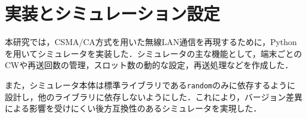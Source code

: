 \documentclass[a4paper, 10pt]{ltjsarticle}
\begin{document}





\section{実装とシミュレーション設定}

本研究では，CSMA/CA方式を用いた無線LAN通信を再現するために，Pythonを用いてシミュレータを実装した．シミュレータの主な機能として，端末ごとのCWや再送回数の管理，スロット数の動的な設定，再送処理などを作成した．

また，シミュレータ本体は標準ライブラリである\texttt{random}のみに依存するように設計し，他のライブラリに依存しないようにした．これにより，バージョン差異による影響を受けにくい後方互換性のあるシミュレータを実現した．


\end{document}
